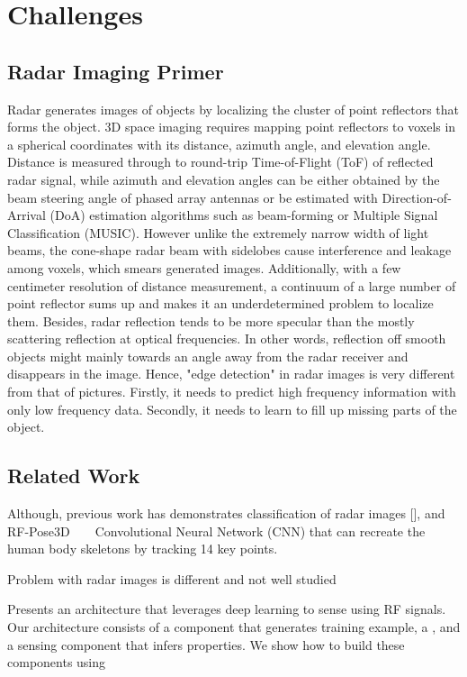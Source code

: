 \section{Challenges}
\subsection{Radar Imaging Primer}
Radar generates images of objects by localizing the cluster of point reflectors that forms the object. 3D space imaging requires mapping point reflectors to voxels in a spherical coordinates with its distance, azimuth angle, and elevation angle. Distance is measured through to round-trip Time-of-Flight (ToF) of reflected radar signal, while azimuth and elevation angles can be either obtained by the beam steering angle of phased array antennas or be estimated with Direction-of-Arrival (DoA) estimation algorithms such as beam-forming or Multiple Signal Classification (MUSIC). However unlike the extremely narrow width of light beams, the cone-shape radar beam with sidelobes cause interference and leakage among voxels, which smears generated images. Additionally, with a few centimeter resolution of distance measurement, a continuum of a large number of point reflector sums up and makes it an underdetermined problem to localize them. Besides, radar reflection tends to be more specular than the mostly scattering reflection at optical frequencies. In other words, reflection off smooth objects might mainly towards an angle away from the radar receiver and disappears in the image. Hence, "edge detection" in radar images is very different from that of pictures. Firstly, it needs to predict high frequency information with only low frequency data. Secondly, it needs to learn to fill up missing parts of the object. 

\subsection{Related Work}
Although, previous work has demonstrates classification of radar images [], and RF-Pose3D ~\cite{rfpose} ~\cite{rfpose3D} Convolutional Neural Network (CNN) that can recreate the human body skeletons by tracking 14 key points. 

Problem with radar images is different and not well studied 

Presents an architecture that leverages deep learning to sense using RF signals. Our architecture consists of a component that generates training example, a , and a sensing component that infers properties. We show how to build these components using 

